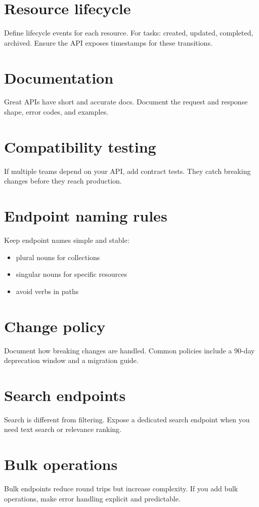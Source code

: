 \section{Resource lifecycle}
Define lifecycle events for each resource.
For tasks: created, updated, completed, archived.
Ensure the API exposes timestamps for these transitions.

\section{Documentation}
Great APIs have short and accurate docs.
Document the request and response shape, error codes, and examples.

\section{Compatibility testing}
If multiple teams depend on your API, add contract tests.
They catch breaking changes before they reach production.

\section{Endpoint naming rules}
Keep endpoint names simple and stable:
\begin{itemize}[nosep]
  \item plural nouns for collections
  \item singular nouns for specific resources
  \item avoid verbs in paths
\end{itemize}

\section{Change policy}
Document how breaking changes are handled.
Common policies include a 90-day deprecation window and a migration guide.

\section{Search endpoints}
Search is different from filtering.
Expose a dedicated search endpoint when you need text search or relevance ranking.

\section{Bulk operations}
Bulk endpoints reduce round trips but increase complexity.
If you add bulk operations, make error handling explicit and predictable.

